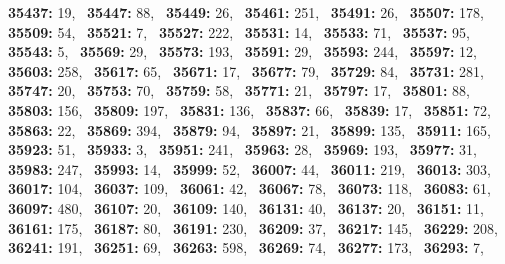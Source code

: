 \textbf{35437:} 19,\allowbreak~ 
\textbf{35447:} 88,\allowbreak~ 
\textbf{35449:} 26,\allowbreak~ 
\textbf{35461:} 251,\allowbreak~ 
\textbf{35491:} 26,\allowbreak~ 
\textbf{35507:} 178,\allowbreak~ 
\textbf{35509:} 54,\allowbreak~ 
\textbf{35521:} 7,\allowbreak~ 
\textbf{35527:} 222,\allowbreak~ 
\textbf{35531:} 14,\allowbreak~ 
\textbf{35533:} 71,\allowbreak~ 
\textbf{35537:} 95,\allowbreak~ 
\textbf{35543:} 5,\allowbreak~ 
\textbf{35569:} 29,\allowbreak~ 
\textbf{35573:} 193,\allowbreak~ 
\textbf{35591:} 29,\allowbreak~ 
\textbf{35593:} 244,\allowbreak~ 
\textbf{35597:} 12,\allowbreak~ 
\textbf{35603:} 258,\allowbreak~ 
\textbf{35617:} 65,\allowbreak~ 
\textbf{35671:} 17,\allowbreak~ 
\textbf{35677:} 79,\allowbreak~ 
\textbf{35729:} 84,\allowbreak~ 
\textbf{35731:} 281,\allowbreak~ 
\textbf{35747:} 20,\allowbreak~ 
\textbf{35753:} 70,\allowbreak~ 
\textbf{35759:} 58,\allowbreak~ 
\textbf{35771:} 21,\allowbreak~ 
\textbf{35797:} 17,\allowbreak~ 
\textbf{35801:} 88,\allowbreak~ 
\textbf{35803:} 156,\allowbreak~ 
\textbf{35809:} 197,\allowbreak~ 
\textbf{35831:} 136,\allowbreak~ 
\textbf{35837:} 66,\allowbreak~ 
\textbf{35839:} 17,\allowbreak~ 
\textbf{35851:} 72,\allowbreak~ 
\textbf{35863:} 22,\allowbreak~ 
\textbf{35869:} 394,\allowbreak~ 
\textbf{35879:} 94,\allowbreak~ 
\textbf{35897:} 21,\allowbreak~ 
\textbf{35899:} 135,\allowbreak~ 
\textbf{35911:} 165,\allowbreak~ 
\textbf{35923:} 51,\allowbreak~ 
\textbf{35933:} 3,\allowbreak~ 
\textbf{35951:} 241,\allowbreak~ 
\textbf{35963:} 28,\allowbreak~ 
\textbf{35969:} 193,\allowbreak~ 
\textbf{35977:} 31,\allowbreak~ 
\textbf{35983:} 247,\allowbreak~ 
\textbf{35993:} 14,\allowbreak~ 
\textbf{35999:} 52,\allowbreak~ 
\textbf{36007:} 44,\allowbreak~ 
\textbf{36011:} 219,\allowbreak~ 
\textbf{36013:} 303,\allowbreak~ 
\textbf{36017:} 104,\allowbreak~ 
\textbf{36037:} 109,\allowbreak~ 
\textbf{36061:} 42,\allowbreak~ 
\textbf{36067:} 78,\allowbreak~ 
\textbf{36073:} 118,\allowbreak~ 
\textbf{36083:} 61,\allowbreak~ 
\textbf{36097:} 480,\allowbreak~ 
\textbf{36107:} 20,\allowbreak~ 
\textbf{36109:} 140,\allowbreak~ 
\textbf{36131:} 40,\allowbreak~ 
\textbf{36137:} 20,\allowbreak~ 
\textbf{36151:} 11,\allowbreak~ 
\textbf{36161:} 175,\allowbreak~ 
\textbf{36187:} 80,\allowbreak~ 
\textbf{36191:} 230,\allowbreak~ 
\textbf{36209:} 37,\allowbreak~ 
\textbf{36217:} 145,\allowbreak~ 
\textbf{36229:} 208,\allowbreak~ 
\textbf{36241:} 191,\allowbreak~ 
\textbf{36251:} 69,\allowbreak~ 
\textbf{36263:} 598,\allowbreak~ 
\textbf{36269:} 74,\allowbreak~ 
\textbf{36277:} 173,\allowbreak~ 
\textbf{36293:} 7,\allowbreak~ 
